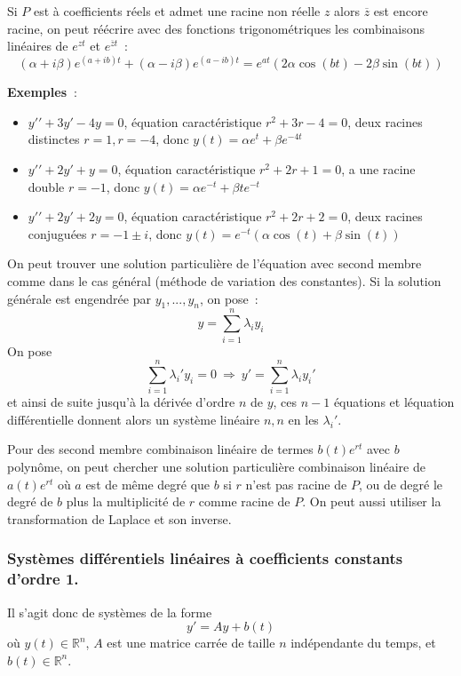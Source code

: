 \documentclass[a4paper,11pt]{article}
\begin{document}
\begin{giacjshere}
Si $P$ est \`a coefficients r\'eels et admet une racine non r\'eelle
$z$ alors $\overline{z}$ est encore racine, on peut r\'e\'ecrire 
avec des fonctions trigonom\'etriques
les combinaisons lin\'eaires de $e^{zt}$ et $e^{\overline{z}t}$~:
$$ (\alpha + i \beta) e^{(a+ib)t} + (\alpha - i \beta)  e^{(a-ib)t}
=  e^{at} ( 2 \alpha \cos(bt) - 2 \beta \sin(bt) )$$

{\bf Exemples~}: 
\begin{itemize}
\item $y'{'}+3y'-4y=0$, \'equation caract\'eristique $r^2+3r-4=0$,
deux racines distinctes $r=1, r=-4$, donc $y(t)=\alpha e^t+\beta e^{-4t}$
\item $y'{'}+2y'+y=0$, \'equation caract\'eristique $r^2+2r+1=0$,
a une racine double $r=-1$, donc $y(t)=\alpha e^{-t}+\beta t e^{-t}$
\item $y'{'}+2y'+2y=0$, \'equation caract\'eristique $r^2+2r+2=0$,
deux racines conjugu\'ees $r=-1\pm i$, donc
$y(t)=e^{-t}(\alpha \cos(t)+\beta \sin(t))$
\end{itemize}

On peut trouver une solution particuli\`ere de l'\'equation avec
second membre comme dans le cas g\'en\'eral (m\'ethode de variation
des constantes). Si la solution g\'en\'erale est engendr\'ee par
$y_1,...,y_n$, on pose~:
$$ y=\sum_{i=1}^n \lambda_i y_i$$
On pose
$$ \sum_{i=1}^n \lambda_i' y_i=0 \ \Rightarrow \ 
y'=\sum_{i=1}^n \lambda_i y_i'$$
et ainsi de suite jusqu'\`a la d\'eriv\'ee d'ordre $n$ de $y$, ces
$n-1$ \'equations et l\'equation diff\'erentielle donnent 
alors un syst\`eme lin\'eaire $n,n$ en
les $\lambda_i'$.

Pour des second membre combinaison lin\'eaire
de termes $b(t)e^{rt}$ avec $b$ polyn\^ome,
on peut chercher une solution particuli\`ere
combinaison lin\'eaire de $a(t)e^{rt}$ o\`u $a$ est de m\^eme
degr\'e que $b$ si $r$ n'est pas racine de $P$, ou de degr\'e le
degr\'e de $b$ plus la multiplicit\'e de $r$ comme racine de $P$.
On peut aussi utiliser la transformation de Laplace et son inverse.

\subsubsection{Syst\`emes diff\'erentiels lin\'eaires \`a coefficients
constants d'ordre 1.}\index{lin\'eaire, syst\`eme diff\'erentiel}
Il s'agit donc de syst\`emes de la forme
$$ y'=Ay+b(t)$$
o\`u $y(t)\in \mathbb{R}^n$, $A$ est une matrice carr\'ee de taille $n$ 
ind\'ependante du temps, et $b(t) \in \mathbb{R}^n$.


\end{giacjshere}
\end{document}
